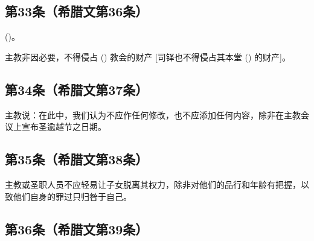 
\subsection{第33条（希腊文第36条）}

 ()。\par

主教非因必要，不得侵占 () 教会的财产 [司铎也不得侵占其本堂 () 的财产]。\par


\subsection{第34条（希腊文第37条）}

\par

主教说：在此中，我们认为不应作任何修改，也不应添加任何内容，除非在主教会议上宣布圣逾越节之日期。\par


\subsection{第35条（希腊文第38条）}

\par

主教或圣职人员不应轻易让子女脱离其权力，除非对他们的品行和年龄有把握，以致他们自身的罪过只归咎于自己。\par


\subsection{第36条（希腊文第39条）}

\par

